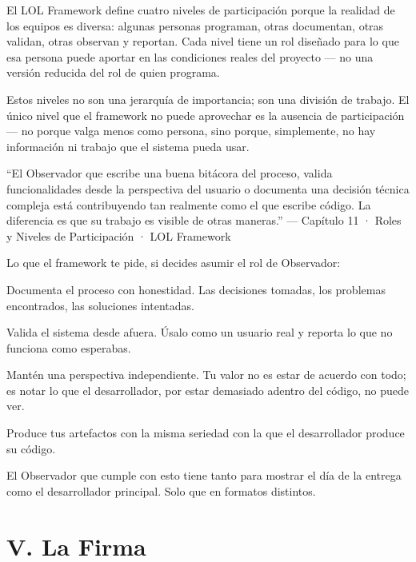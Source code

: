 \documentclass[14pt,a4paper,oneside]{extbook}
\begin{document}
El LOL Framework define cuatro niveles de participación porque la realidad de los equipos es diversa: algunas personas programan, otras documentan, otras validan, otras observan y reportan. Cada nivel tiene un rol diseñado para lo que esa persona puede aportar en las condiciones reales del proyecto — no una versión reducida del rol de quien programa.

Estos niveles no son una jerarquía de importancia; son una división de trabajo. El único nivel que el framework no puede aprovechar es la ausencia de participación — no porque valga menos como persona, sino porque, simplemente, no hay información ni trabajo que el sistema pueda usar.



\begin{authorobservation}
\enquote{El Observador que escribe una buena bitácora del proceso, valida funcionalidades desde la perspectiva del usuario o documenta una decisión técnica compleja está contribuyendo tan realmente como el que escribe código. La diferencia es que su trabajo es visible de otras maneras.} — Capítulo 11 · Roles y Niveles de Participación · LOL Framework
\end{authorobservation}



Lo que el framework te pide, si decides asumir el rol de Observador:



Documenta el proceso con honestidad. Las decisiones tomadas, los problemas encontrados, las soluciones intentadas.

Valida el sistema desde afuera. Úsalo como un usuario real y reporta lo que no funciona como esperabas.

Mantén una perspectiva independiente. Tu valor no es estar de acuerdo con todo; es notar lo que el desarrollador, por estar demasiado adentro del código, no puede ver.

Produce tus artefactos con la misma seriedad con la que el desarrollador produce su código.



El Observador que cumple con esto tiene tanto para mostrar el día de la entrega como el desarrollador principal. Solo que en formatos distintos.



\section{V. La Firma}
\end{document}
